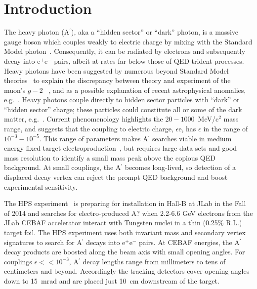 \documentclass[final,3p,times,twocolumn]{elsarticle}
\newcommand{\Aprime}{A\ensuremath{^\prime}}
\newcommand{\ee}{e$^+$e$^-$}
\begin{document}
 
\newpage

\linenumbers

\section{Introduction}
\label{introduction}
The heavy photon (\Aprime{}), aka a ``hidden sector'' or ``dark'' photon, is a massive gauge boson which 
couples weakly to electric charge by mixing with the Standard Model 
photon~\cite{Holdom:1985ag,Galison:1983pa}. Consequently, it can be radiated by electrons and subsequently decay 
into \ee{} pairs, albeit at rates far below those of QED trident processes. Heavy photons have been 
suggested by numerous beyond Standard Model theories~\cite{Essig:2013lka} to explain the 
discrepancy 
between theory and experiment of the muon's $g-2$ ~\cite{Pospelov:2008zw}, and as a possible 
explanation of recent astrophysical 
anomalies, e.g.~\cite{Adriani:2008zr,FermiLAT:2011ab,Aguilar:2013qda}.  
Heavy photons couple directly to  hidden sector particles with ``dark'' or ``hidden sector'' charge; these 
particles could constitute all or some of the dark matter, e.g.~\cite{ArkaniHamed:2008qn,Pospelov:2008jd}. 
Current phenomenology highlights the $20-1000$~MeV/c$^{2}$ mass range, and 
suggests that  the coupling to electric charge, $\epsilon$e, has $\epsilon$ in the range of 
$10^{-3} -10^{-5}$. This range of parameters makes \Aprime{} searches viable in 
medium energy fixed target electroproduction~\cite{Bjorken:2009mm}, but requires large data sets and 
good mass resolution to identify a small mass peak above the copious QED background. At small 
couplings, the \Aprime{} becomes long-lived, so detection of a displaced decay vertex can reject the prompt 
QED background and boost experimental sensitivity.  

The HPS experiment~\cite{HPS_proposal_2010} is preparing for installation in Hall-B at JLab in the Fall of 
2014 and searches for electro-produced A? when 2.2-6.6 GeV electrons from the JLab CEBAF accelerator 
interact with Tungsten nuclei in a thin (0.25\% R.L.) target foil. The HPS experiment uses both 
invariant mass and secondary vertex signatures to search for \Aprime{} decays into \ee{} pairs. 
At CEBAF energies, the \Aprime{} decay products are boosted along the beam axis with small opening angles.
For couplings $\epsilon << 10^{-3}$,  \Aprime{} decay lengths range from millimeters to tens of centimeters and 
beyond. Accordingly the tracking detectors cover opening angles down to 15~mrad and are placed just 10~cm 
downstream of the target.
\end{document}
